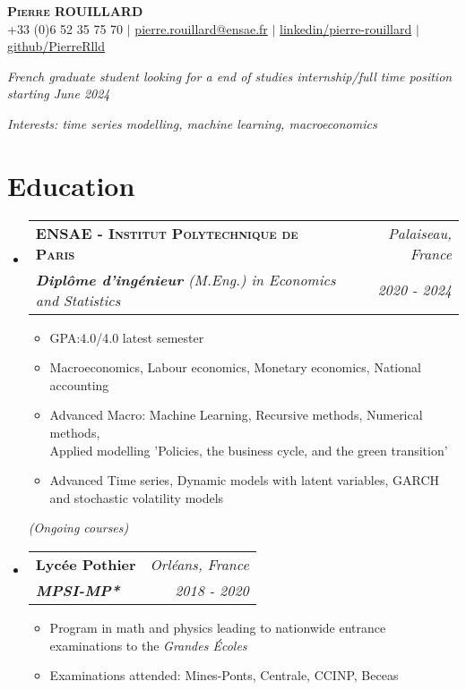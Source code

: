 \documentclass[letterpaper,10pt]{article}
\makeatletter
\newcommand{\resumeItem}[1]{
    \item\small{
            {#1 \vspace{-2pt}}
    }
}
\newcommand{\resumeSubheading}[4]{
    \vspace{-2pt}\item
    \begin{tabular*}{0.97\textwidth}[t]{l@{\extracolsep{\fill}}r}
        \textbf{#1}       & #2                 \\
        \textit{\small#3} & \textit{\small #4} \\
    \end{tabular*}\vspace{-7pt}
}
\newcommand{\resumeSubHeadingListStart}{\begin{itemize}[leftmargin=0.15in, label={}]}
\newcommand{\resumeSubHeadingListEnd}{\end{itemize}}
\newcommand{\resumeItemListStart}{\begin{itemize}}
\newcommand{\resumeItemListEnd}{\end{itemize}\vspace{-5pt}}
\makeatother
\begin{document}
\begin{center}
{\Large\textsc{\textbf{Pierre ROUILLARD}}} \\ \vspace{2pt}
\small +33 (0)6 52 35 75 70 $|$ \href{mailto:pierre.rouillard@ensae.fr}{pierre.rouillard@ensae.fr} $|$
\href{https://www.linkedin.com/in/pierre-rouillard/}{linkedin/pierre-rouillard} $|$
\href{https://github.com/PierreRlld}{github/PierreRlld}\\
\vspace{.1cm}
\end{center}

\begin{center}
    \textit{French graduate student looking for a end of studies internship/full time position starting June 2024}\par
    \textit{Interests: time series modelling, machine learning, macroeconomics}
\end{center}

\section{Education}
\resumeSubHeadingListStart
\resumeSubheading
{\textsc{ENSAE - Institut Polytechnique de Paris}}{\textit{\small{Palaiseau, France}}}{\textbf{Diplôme d'ingénieur} (M.Eng.) in Economics and Statistics}{2020 - 2024}
\resumeItemListStart
\resumeItem{GPA:4.0/4.0 latest semester}
\resumeItem{Macroeconomics, Labour economics, Monetary economics, National accounting}
\resumeItem{Advanced Macro: Machine Learning, Recursive methods, Numerical methods, \\Applied modelling 'Policies, the business cycle, and the green transition'}
\resumeItem{Advanced Time series, Dynamic models with latent variables, GARCH and stochastic volatility models}
\resumeItemListEnd
\quad \textit{(Ongoing courses)}
\vspace{.1cm}
\resumeSubheading{Lycée Pothier}{\textit{\small{Orléans, France}}}
{\textbf{MPSI-MP*}}{2018 - 2020}
\resumeItemListStart
\resumeItem{Program in math and physics leading to nationwide entrance examinations to the \textit{Grandes Écoles}}
\resumeItem{Examinations attended: Mines-Ponts, Centrale, CCINP, Beceas}
\resumeItemListEnd
\resumeSubHeadingListEnd
\vspace{0cm}
\end{document}
